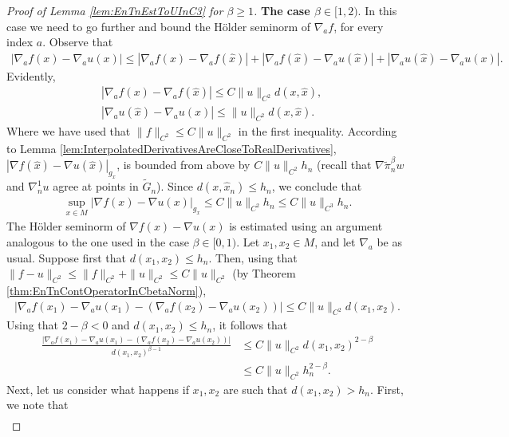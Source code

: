 \documentclass[11pt,reqno]{amsart}
\numberwithin{equation}{section}
\theoremstyle{plain}
\def\grad{\nabla}
\begin{document}
\begin{proof}[Proof of Lemma \ref{lem:EnTnEstToUInC3} for $\beta \geq 1$]
  \textbf{The case $\beta\in [1,2)$}. In this case we need to go further and bound the H\"older seminorm of $\nabla_a f$, for every index $a$. Observe that
  \begin{align*}
    |\nabla_{a} f(x)-\nabla_{a} u(x)| \leq |\nabla_{a} f(x)-\nabla_{a}f(\hat x)|+ |\nabla_af(\hat x)-\nabla_a u(\hat x)| + |\nabla_{a}u(\hat x) -\nabla_{a} u(x)|.   
  \end{align*}
  Evidently,
  \begin{align*}
    & |\nabla_{a} f(x)-\nabla_{a}f(\hat x)| \leq  C\|u\|_{C^2}d(x,\hat x),\\
    &  |\nabla_{a}u(\hat x) -\nabla_{a} u(x)| \leq \|u\|_{C^2}d(x,\hat x).
  \end{align*}
  Where we have used that $\|f\|_{C^2} \leq C\|u\|_{C^2}$ in the first inequality. According to Lemma \ref{lem:InterpolatedDerivativesAreCloseToRealDerivatives}, $|\nabla f(\hat x)-\nabla u(\hat x)|_{g_x}$, is bounded from above by $C\|u\|_{C^2}h_n$  (recall that $\grad \tilde \pi_n^\beta w$ and $\grad^1_n u$ agree at points in $\tilde G_n$). Since $d(x,\hat x_n)\leq h_n$, we conclude that
  \begin{align*}
    \sup \limits_{x\in M} |\nabla f(x)-\nabla u(x)|_{g_x} \leq C\|u\|_{C^2}h_n \leq C\|u\|_{C^3}h_n.
  \end{align*}	  
  The H\"older seminorm of $\nabla f(x)-\nabla u(x)$ is estimated using an argument analogous to the one used in the case $\beta \in [0,1)$. Let $x_1,x_2 \in M$, and let $\nabla_a$ be as usual. Suppose first that $d(x_1,x_2) \leq h_n$. Then, using that $\|f-u\|_{C^2} \leq \|f\|_{C^2}+\|u\|_{C^2} \leq C\|u\|_{C^2}$ (by Theorem \ref{thm:EnTnContOperatorInCbetaNorm}),
  \begin{align*}
    |\nabla_af(x_1)-\nabla_a u(x_1)-(\nabla_af(x_2)-\nabla_a u(x_2))|\leq C\|u\|_{C^2}d(x_1,x_2).
  \end{align*}
  Using that $2-\beta<0$ and $d(x_1,x_2) \leq h_n$, it follows that
  \begin{align*}
    \frac{|\nabla_af(x_1)-\nabla_a u(x_1)-(\nabla_af(x_2)-\nabla_a u(x_2))|}{d(x_1,x_2)^{\beta-1}} & \leq C\|u\|_{C^2}d(x_1,x_2)^{2-\beta}\\
      & \leq C\|u\|_{C^2}h_n^{2-\beta}.	
  \end{align*}
  Next, let us consider what happens if $x_1,x_2$ are such that $d(x_1,x_2) > h_n$. First, we note that
  \begin{align*}

\end{align*}
\end{proof}
\end{document}
